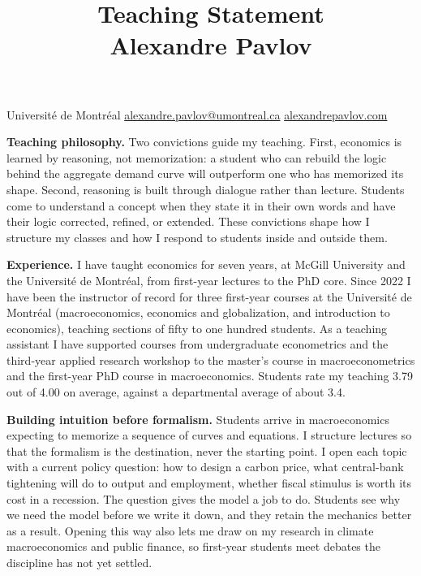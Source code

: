 \documentclass[11pt]{article}
\title{\vspace{-2em}\textbf{Teaching Statement}\\[0.3em]\large Alexandre Pavlov}
\author{}
\date{}
\begin{document}
\maketitle
\vspace{-3em}

\begin{center}
\small Université de Montréal \hspace{0.5em}\textbar\hspace{0.5em}
\href{mailto:alexandre.pavlov@umontreal.ca}{alexandre.pavlov@umontreal.ca} \hspace{0.5em}\textbar\hspace{0.5em}
\href{https://alexandrepavlov.com/}{alexandrepavlov.com}
\end{center}
\vspace{0.5em}

\textbf{Teaching philosophy.}
Two convictions guide my teaching. First, economics is learned by reasoning, not memorization: a student who can rebuild the logic behind the aggregate demand curve will outperform one who has memorized its shape. Second, reasoning is built through dialogue rather than lecture. Students come to understand a concept when they state it in their own words and have their logic corrected, refined, or extended. These convictions shape how I structure my classes and how I respond to students inside and outside them.

\textbf{Experience.}
I have taught economics for seven years, at McGill University and the Université de Montréal, from first-year lectures to the PhD core. Since 2022 I have been the instructor of record for three first-year courses at the Université de Montréal (macroeconomics, economics and globalization, and introduction to economics), teaching sections of fifty to one hundred students. As a teaching assistant I have supported courses from undergraduate econometrics and the third-year applied research workshop to the master's course in macroeconometrics and the first-year PhD course in macroeconomics. Students rate my teaching 3.79 out of 4.00 on average, against a departmental average of about 3.4.

\textbf{Building intuition before formalism.}
Students arrive in macroeconomics expecting to memorize a sequence of curves and equations. I structure lectures so that the formalism is the destination, never the starting point. I open each topic with a current policy question: how to design a carbon price, what central-bank tightening will do to output and employment, whether fiscal stimulus is worth its cost in a recession. The question gives the model a job to do. Students see why we need the model before we write it down, and they retain the mechanics better as a result. Opening this way also lets me draw on my research in climate macroeconomics and public finance, so first-year students meet debates the discipline has not yet settled.
\end{document}
